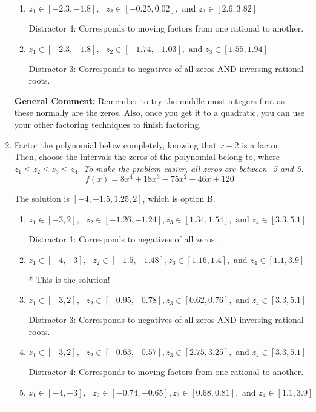 \documentclass{extbook}[14pt]
\newcommand{\litem}[1]{\item #1

\rule{\textwidth}{0.4pt}}
\begin{document}
\begin{enumerate}
{\begin{enumerate}[label=\Alph*.]
* This is the solution!
\item \( z_1 \in [-2.3, -1.8], \text{   }  z_2 \in [-0.25, 0.02], \text{   and   } z_3 \in [2.6, 3.82] \)

 Distractor 4: Corresponds to moving factors from one rational to another.
\item \( z_1 \in [-2.3, -1.8], \text{   }  z_2 \in [-1.74, -1.03], \text{   and   } z_3 \in [1.55, 1.94] \)

 Distractor 3: Corresponds to negatives of all zeros AND inversing rational roots.
\end{enumerate}

\textbf{General Comment:} Remember to try the middle-most integers first as these normally are the zeros. Also, once you get it to a quadratic, you can use your other factoring techniques to finish factoring.
}
\litem{
Factor the polynomial below completely, knowing that $x-2$ is a factor. Then, choose the intervals the zeros of the polynomial belong to, where $z_1 \leq z_2 \leq z_3 \leq z_4$. \textit{To make the problem easier, all zeros are between -5 and 5.}
\[ f(x) = 8x^{4} +18 x^{3} -75 x^{2} -46 x + 120 \]

The solution is \( [-4, -1.5, 1.25, 2] \), which is option B.\begin{enumerate}[label=\Alph*.]
\item \( z_1 \in [-3, 2], \text{   }  z_2 \in [-1.26, -1.24], z_3 \in [1.34, 1.54], \text{   and   } z_4 \in [3.3, 5.1] \)

 Distractor 1: Corresponds to negatives of all zeros.
\item \( z_1 \in [-4, -3], \text{   }  z_2 \in [-1.5, -1.48], z_3 \in [1.16, 1.4], \text{   and   } z_4 \in [1.1, 3.9] \)

* This is the solution!
\item \( z_1 \in [-3, 2], \text{   }  z_2 \in [-0.95, -0.78], z_3 \in [0.62, 0.76], \text{   and   } z_4 \in [3.3, 5.1] \)

 Distractor 3: Corresponds to negatives of all zeros AND inversing rational roots.
\item \( z_1 \in [-3, 2], \text{   }  z_2 \in [-0.63, -0.57], z_3 \in [2.75, 3.25], \text{   and   } z_4 \in [3.3, 5.1] \)

 Distractor 4: Corresponds to moving factors from one rational to another.
\item \( z_1 \in [-4, -3], \text{   }  z_2 \in [-0.74, -0.65], z_3 \in [0.68, 0.81], \text{   and   } z_4 \in [1.1, 3.9] \)


\end{enumerate}}
\end{enumerate}
\end{document}
